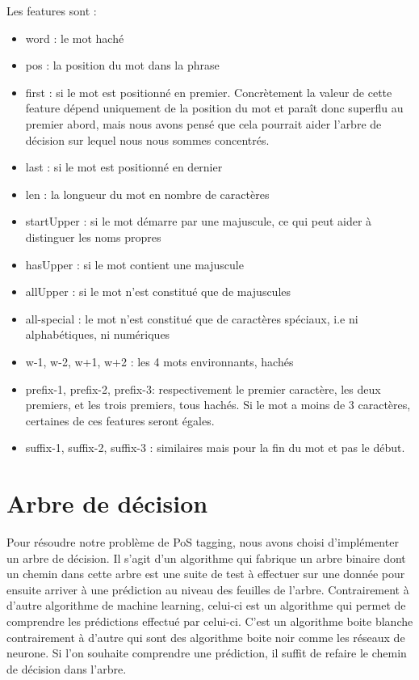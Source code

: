 \documentclass[french, 14pt]{memoir}
\begin{document}
Les features sont :
\begin{itemize}
	\item word : le mot haché
	\item pos : la position du mot dans la phrase
	\item first : si le mot est positionné en premier. Concrètement la valeur de cette feature dépend uniquement de la position du mot et paraît donc superflu au premier abord, mais nous avons pensé que cela pourrait aider l'arbre de décision sur lequel nous nous sommes concentrés.
	\item last : si le mot est positionné en dernier
	\item len : la longueur du mot en nombre de caractères
	\item startUpper : si le mot démarre par une majuscule, ce qui peut aider à distinguer les noms propres
	\item hasUpper : si le mot contient une majuscule
	\item allUpper : si le mot n'est constitué que de majuscules
	\item all-special : le mot n'est constitué que de caractères spéciaux, i.e ni alphabétiques, ni numériques
	\item w-1, w-2, w+1, w+2 : les 4 mots environnants, hachés
	\item prefix-1, prefix-2, prefix-3: respectivement le premier caractère, les deux premiers, et les trois premiers, tous hachés. Si le mot a moins de 3 caractères, certaines de ces features seront égales.
	\item suffix-1, suffix-2, suffix-3 : similaires mais pour la fin du mot et pas le début.
\end{itemize}

\section{Arbre de décision}

Pour résoudre notre problème de PoS tagging, nous avons choisi d'implémenter un arbre de décision. Il s'agit d'un algorithme qui fabrique un arbre binaire dont un chemin dans cette arbre est une suite de test à effectuer sur une donnée pour ensuite arriver à une prédiction au niveau des feuilles de l'arbre. Contrairement à d'autre algorithme de machine learning, celui-ci est un algorithme qui permet de comprendre les prédictions effectué par celui-ci. C'est un algorithme boite blanche contrairement à d'autre qui sont des algorithme boite noir comme les réseaux de neurone. 
Si l'on souhaite comprendre une prédiction, il suffit de refaire le chemin de décision dans l'arbre. 
\end{document}
